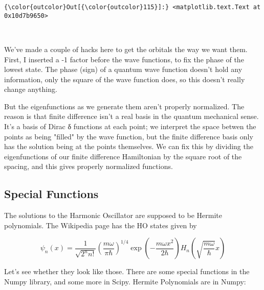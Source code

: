 \documentclass[11pt]{article}
\begin{document}
\begin{Verbatim}[commandchars=\\\{\}]
{\color{outcolor}Out[{\color{outcolor}115}]:} <matplotlib.text.Text at 0x10d7b9650>
\end{Verbatim}
            
    \begin{center}
    \end{center}
    { \hspace*{\fill} \\}
    
    We've made a couple of hacks here to get the orbitals the way we want
them. First, I inserted a -1 factor before the wave functions, to fix
the phase of the lowest state. The phase (sign) of a quantum wave
function doesn't hold any information, only the square of the wave
function does, so this doesn't really change anything.

But the eigenfunctions as we generate them aren't properly normalized.
The reason is that finite difference isn't a real basis in the quantum
mechanical sense. It's a basis of Dirac δ functions at each point; we
interpret the space betwen the points as being "filled" by the wave
function, but the finite difference basis only has the solution being at
the points themselves. We can fix this by dividing the eigenfunctions of
our finite difference Hamiltonian by the square root of the spacing, and
this gives properly normalized functions.

    \subsection{Special Functions}\label{special-functions}

The solutions to the Harmonic Oscillator are supposed to be Hermite
polynomials. The Wikipedia page has the HO states given by

\[\psi_n(x) = \frac{1}{\sqrt{2^n n!}}
\left(\frac{m\omega}{\pi\hbar}\right)^{1/4}
\exp\left(-\frac{m\omega x^2}{2\hbar}\right)
H_n\left(\sqrt{\frac{m\omega}{\hbar}}x\right)\]

Let's see whether they look like those. There are some special functions
in the Numpy library, and some more in Scipy. Hermite Polynomials are in
Numpy:
\end{document}
